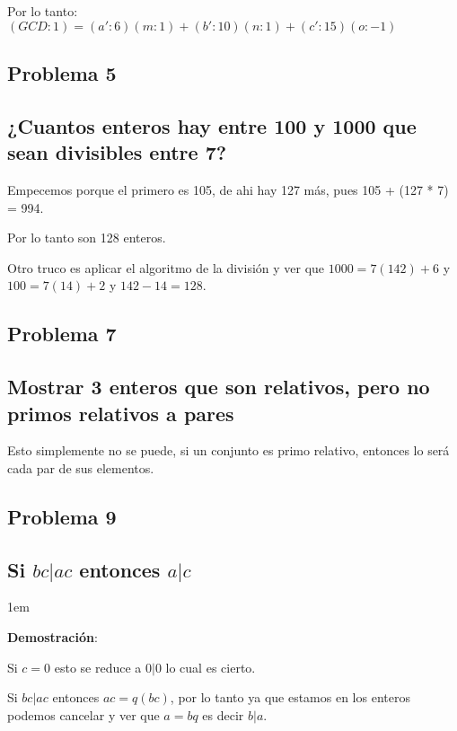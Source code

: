 \documentclass[12pt, fleqn]{article}                             %
\newenvironment{SmallIndentation}[1][0.75em]                    %
    {\begin{adjustwidth}{#1}{}\begin{footnotesize}}                 %
    {\end{footnotesize}\end{adjustwidth}}                           %
\begin{document}
            Por lo tanto:
            $(GCD:1) = (a':6)(m:1) +(b':10)(n:1) + (c': 15)(o:-1)$


    \clearpage
    \subsection{Problema 5}
    \subsection*{¿Cuantos enteros hay entre 100 y 1000 que sean divisibles entre 7?}

        Empecemos porque el primero es 105, de ahi hay 127 más, pues 105 + (127 * 7) = 994.

        Por lo tanto son 128 enteros.

        Otro truco es aplicar el algoritmo de la división y ver que 
        $1000 = 7(142) + 6$ y $100 = 7(14) + 2$ y $142-14 = 128$.


    \subsection{Problema 7}
    \subsection*{Mostrar 3 enteros que son relativos, pero no primos relativos a pares}

        Esto simplemente no se puede, si un conjunto es primo relativo, entonces lo será cada
        par de sus elementos.


    \subsection{Problema 9}
    \subsection*{Si $bc|ac$ entonces $a|c$}

        \begin{SmallIndentation}[1em]
            \textbf{Demostración}:

            Si $c=0$ esto se reduce a $0|0$ lo cual es cierto.

            Si $bc|ac$ entonces $ac = q(bc)$, por lo tanto ya que estamos en los
            enteros podemos cancelar y ver que $a = bq$ es decir $b|a$.

        \end{SmallIndentation}
\end{document}
